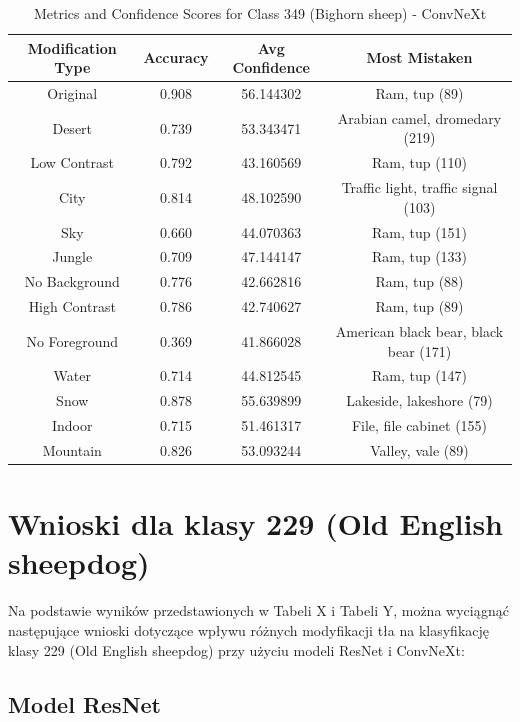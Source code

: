 \begin{table}
	\centering
	\begin{tabular}{|c|c|c|c|}
		\hline
		\textbf{Modification Type} & \textbf{Accuracy} & \textbf{Avg Confidence} & \textbf{Most Mistaken} \\
		\hline
		Original & 0.908 & 56.144302 & Ram, tup (89) \\
		\hline
		Desert & 0.739 & 53.343471 & Arabian camel, dromedary (219) \\
		\hline
		Low Contrast & 0.792 & 43.160569 & Ram, tup (110) \\
		\hline
		City & 0.814 & 48.102590 & Traffic light, traffic signal (103) \\
		\hline
		Sky & 0.660 & 44.070363 & Ram, tup (151) \\
		\hline
		Jungle & 0.709 & 47.144147 & Ram, tup (133) \\
		\hline
		No Background & 0.776 & 42.662816 & Ram, tup (88) \\
		\hline
		High Contrast & 0.786 & 42.740627 & Ram, tup (89) \\
		\hline
		No Foreground & 0.369 & 41.866028 & American black bear, black bear (171) \\
		\hline
		Water & 0.714 & 44.812545 & Ram, tup (147) \\
		\hline
		Snow & 0.878 & 55.639899 & Lakeside, lakeshore (79) \\
		\hline
		Indoor & 0.715 & 51.461317 & File, file cabinet (155) \\
		\hline
		Mountain & 0.826 & 53.093244 & Valley, vale (89) \\
		\hline
	\end{tabular}
	\caption{Metrics and Confidence Scores for Class 349 (Bighorn sheep) - ConvNeXt}
	\label{tab:metrics_confidence_class_349_convnext}
\end{table}

\section*{Wnioski dla klasy 229 (Old English sheepdog)}

Na podstawie wyników przedstawionych w Tabeli X i Tabeli Y, można wyciągnąć następujące wnioski dotyczące wpływu różnych modyfikacji tła na klasyfikację klasy 229 (Old English sheepdog) przy użyciu modeli ResNet i ConvNeXt:

\subsection*{Model ResNet}


